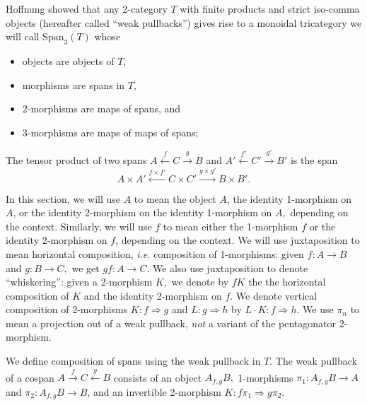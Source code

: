 \documentclass[12pt,twoside,openright]{report}
\newcommand{\maps}{\colon}
\newcommand{\Span}{\mbox{Span}}
\begin{document}
Hoffnung showed that any 2-category $T$ with finite products and strict iso-comma objects (hereafter called ``weak pullbacks'') gives rise to a monoidal tricategory we will call $\Span_3(T)$ whose
\begin{itemize}
  \item objects are objects of $T$,
  \item morphisms are spans in $T$,
  \item 2-morphisms are maps of spans, and
  \item 3-morphisms are maps of maps of spans;
\end{itemize}
The tensor product of two spans $A \stackrel{f}{\leftarrow} C \stackrel{g}{\rightarrow} B$ 
and $A' \stackrel{f'}{\leftarrow} C' \stackrel{g'}{\rightarrow} B'$ is the span
\[A \times A' \stackrel{f \times f'}{\leftarrow} C \times C' \stackrel{g \times g'}{\rightarrow} B \times B'.\]

In this section, we will use $A$ to mean the object $A$, the identity 1-morphism on $A$, or the identity 2-morphism on the identity 1-morphism on $A,$ depending on the context.  Similarly, we will use $f$ to mean either the 1-morphism $f$ or the identity 2-morphism on $f$, depending on the context.  We will use juxtaposition to mean horizontal composition, {\em i.e.} composition of 1-morphisms: given $f\maps A \to B$ and $g\maps B \to C,$ we get $gf\maps A \to C.$  We also use juxtaposition to denote ``whiskering'': given a 2-morphism $K,$ we denote by $fK$ the the horizontal composition of $K$ and the identity 2-morphism on $f.$  We denote vertical composition of 2-morphisms $K\maps f\Rightarrow g$ and $L\maps g\Rightarrow h$ by $L\cdot K\maps f\Rightarrow h.$  We use $\pi_n$ to mean a projection out of a weak pullback, {\em not} a variant of the pentagonator 2-morphism.

We define composition of spans using the weak pullback in $T$.  The weak pullback of a cospan $A \stackrel{f}{\to} C \stackrel{g}{\leftarrow} B$ consists of an object $A_{f,g}B,$ 1-morphisms $\pi_1\maps A_{f,g}B \to A$ and $\pi_2\maps A_{f,g}B \to B$, and an invertible 2-morphism $K\maps f\pi_1 \Rightarrow g\pi_2.$  
\end{document}
